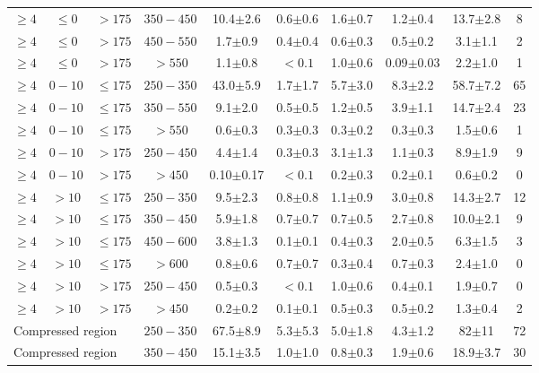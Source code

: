 \begin{table}[htb]
\begin{tabular}{|c|c|c|c|c|c|c|c|c|c|}
$\geq4$ & $\leq0$ &     $>175$ & $350-450$ & 10.4$\pm$2.6 & 0.6$\pm$0.6 & 1.6$\pm$0.7 & 1.2$\pm$0.4 & 13.7$\pm$2.8 & 8 \\
$\geq4$ & $\leq0$ &     $>175$ & $450-550$ & 1.7$\pm$0.9 & 0.4$\pm$0.4 & 0.6$\pm$0.3 & 0.5$\pm$0.2 & 3.1$\pm$1.1 & 2 \\
$\geq4$ & $\leq0$ &     $>175$ &    $>550$ & 1.1$\pm$0.8 & $<0.1$ & 1.0$\pm$0.6 & 0.09$\pm$0.03 & 2.2$\pm$1.0 & 1 \\
\hline
$\geq4$ &   $0-10$ & $\leq175$ & $250-350$ & 43.0$\pm$5.9 & 1.7$\pm$1.7 & 5.7$\pm$3.0 & 8.3$\pm$2.2 & 58.7$\pm$7.2 & 65 \\
$\geq4$ &   $0-10$ & $\leq175$ & $350-550$ & 9.1$\pm$2.0 & 0.5$\pm$0.5 & 1.2$\pm$0.5 & 3.9$\pm$1.1 & 14.7$\pm$2.4 & 23 \\
$\geq4$ &   $0-10$ & $\leq175$ &    $>550$ & 0.6$\pm$0.3 & 0.3$\pm$0.3 & 0.3$\pm$0.2 & 0.3$\pm$0.3 & 1.5$\pm$0.6 & 1 \\
\hline
$\geq4$ &   $0-10$ &     $>175$ & $250-450$ & 4.4$\pm$1.4 & 0.3$\pm$0.3 & 3.1$\pm$1.3 & 1.1$\pm$0.3 & 8.9$\pm$1.9 & 9 \\
$\geq4$ &   $0-10$ &     $>175$ &    $>450$ & 0.10$\pm$0.17 & $<0.1$ & 0.2$\pm$0.3 & 0.2$\pm$0.1 & 0.6$\pm$0.2 & 0 \\
\hline
$\geq4$ &    $>10$ & $\leq175$ & $250-350$ & 9.5$\pm$2.3 & 0.8$\pm$0.8 & 1.1$\pm$0.9 & 3.0$\pm$0.8 & 14.3$\pm$2.7 & 12 \\
$\geq4$ &    $>10$ & $\leq175$ & $350-450$ & 5.9$\pm$1.8 & 0.7$\pm$0.7 & 0.7$\pm$0.5 & 2.7$\pm$0.8 & 10.0$\pm$2.1 & 9 \\
$\geq4$ &    $>10$ & $\leq175$ & $450-600$ & 3.8$\pm$1.3 & 0.1$\pm$0.1 & 0.4$\pm$0.3 & 2.0$\pm$0.5 & 6.3$\pm$1.5 & 3 \\
$\geq4$ &    $>10$ & $\leq175$ &    $>600$ & 0.8$\pm$0.6 & 0.7$\pm$0.7 & 0.3$\pm$0.4 & 0.7$\pm$0.3 & 2.4$\pm$1.0 & 0 \\
\hline
$\geq4$ &    $>10$ &     $>175$ & $250-450$ & 0.5$\pm$0.3 & $<0.1$ & 1.0$\pm$0.6 & 0.4$\pm$0.1 & 1.9$\pm$0.7 & 0 \\
$\geq4$ &    $>10$ &     $>175$ &    $>450$ & 0.2$\pm$0.2 & 0.1$\pm$0.1 & 0.5$\pm$0.3 & 0.5$\pm$0.2 & 1.3$\pm$0.4 & 2 \\
\hline
\hline
\multicolumn{3}{|l|}{Compressed region} & $250-350$ & 67.5$\pm$8.9 & 5.3$\pm$5.3 & 5.0$\pm$1.8 & 4.3$\pm$1.2 & 82$\pm$11 & 72 \\
\multicolumn{3}{|l|}{Compressed region} & $350-450$ & 15.1$\pm$3.5 & 1.0$\pm$1.0 & 0.8$\pm$0.3 & 1.9$\pm$0.6 & 18.9$\pm$3.7 & 30 \\

\end{tabular}
\end{table}

